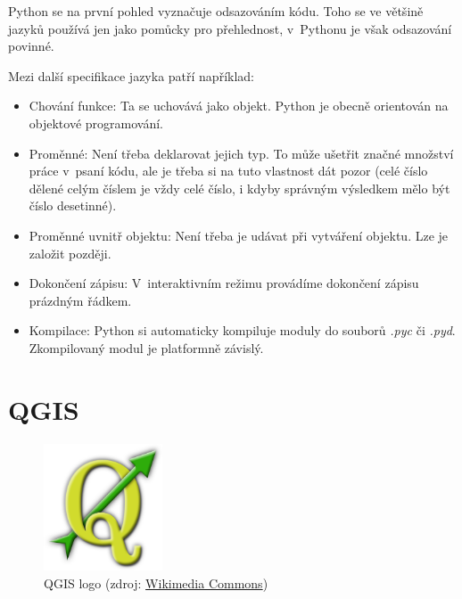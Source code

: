 Python se na první pohled vyznačuje odsazováním kódu. Toho se ve většině jazyků používá jen jako
pomůcky pro přehlednost, v~Pythonu je však odsazování povinné. 

Mezi další specifikace jazyka patří například: 
\begin{itemize}

	\item Chování funkce: Ta se uchovává jako objekt. Python je obecně orientován na objektové
	programování. 
	
	\item Proměnné: Není třeba deklarovat jejich typ. To může ušetřit značné množství práce
	v~psaní kódu, ale je třeba si na tuto vlastnost dát pozor (celé číslo dělené celým číslem je
	vždy celé číslo, i kdyby správným výsledkem mělo být číslo desetinné). 
	
	\item Proměnné uvnitř objektu: Není třeba je udávat při vytváření objektu. Lze je založit později. 
	\item Dokončení zápisu: V~interaktivním režimu provádíme dokončení zápisu prázdným řádkem. 
	\item Kompilace: Python si automaticky kompiluje moduly do souborů \textit{.pyc} či \textit{.pyd}.
	Zkompilovaný modul je platformně závislý. 

\end{itemize}


\section{QGIS}
\label{qgis}

  \begin{figure}[H]
    \centering
      \includegraphics[width=100pt]{./pictures/qgis.png}
      \caption[QGIS logo]{QGIS logo 
      (zdroj: \href{https://commons.wikimedia.org/wiki/File:QGIS\_logo.svg}{Wikimedia Commons})}
      \label{fig:qgis}
  \end{figure}

